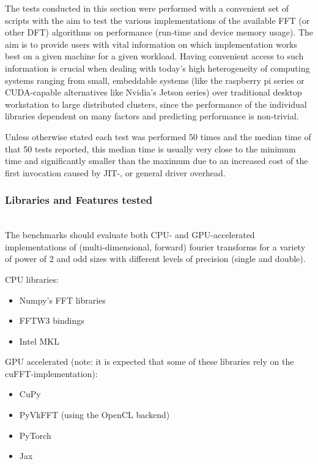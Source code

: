 \documentclass[english,11pt,a4paper,table]{article} %
\begin{document}
The tests conducted in this section were performed with a convenient set of scripts with the aim to test the various implementations of the available FFT (or other DFT) algorithms on performance (run-time and device memory usage).
The aim is to provide users with vital information on which implementation works best on a given machine for a given workload.
Having convenient access to such information is crucial when dealing with today's high heterogeneity of computing systems ranging from small, embeddable systems (like the raspberry pi series or CUDA-capable alternatives like Nvidia's Jetson series) over traditional desktop workstation to large distributed clusters, since the performance of the individual libraries dependent on many factors and predicting performance is non-trivial.

Unless otherwise stated each test was performed 50 times and the median time of that 50 tests reported, this median time is usually very close to the minimum time and significantly smaller than the maximum due to an increased cost of the first invocation caused by JIT-, or general driver overhead.

\subsubsection{Libraries and Features tested}\mbox{}\\

The benchmarks should evaluate both CPU- and GPU-accelerated implementations of (multi-dimensional, forward) fourier transforms for a variety of power of 2 and odd sizes with different levels of precision (single and double).

CPU libraries:
\begin{itemize}
	\item Numpy's FFT libraries
	\item FFTW3 bindings
	\item Intel MKL
\end{itemize}

GPU accelerated (note: it is expected that some of these libraries rely on the cuFFT-implementation):
\label{tested-gpu-libraries}
\begin{itemize}
	\item CuPy
	\item PyVkFFT (using the OpenCL backend)\cite{vkfft, pyvkfft}
	\item PyTorch
	\item Jax
\end{itemize}
\end{document}
